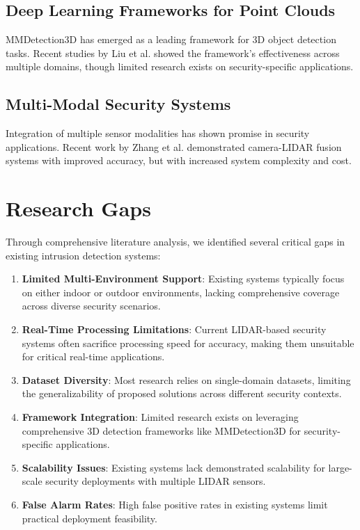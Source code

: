 \documentclass[conference]{IEEEtran}
\begin{document}
\subsection{Deep Learning Frameworks for Point Clouds}
MMDetection3D has emerged as a leading framework for 3D object detection tasks. Recent studies by Liu et al. \cite{liu2023mmdet} showed the framework's effectiveness across multiple domains, though limited research exists on security-specific applications.

\subsection{Multi-Modal Security Systems}
Integration of multiple sensor modalities has shown promise in security applications. Recent work by Zhang et al. \cite{zhang2023fusion} demonstrated camera-LIDAR fusion systems with improved accuracy, but with increased system complexity and cost.

\section{Research Gaps}

Through comprehensive literature analysis, we identified several critical gaps in existing intrusion detection systems:

\begin{enumerate}
\item \textbf{Limited Multi-Environment Support}: Existing systems typically focus on either indoor or outdoor environments, lacking comprehensive coverage across diverse security scenarios.

\item \textbf{Real-Time Processing Limitations}: Current LIDAR-based security systems often sacrifice processing speed for accuracy, making them unsuitable for critical real-time applications.

\item \textbf{Dataset Diversity}: Most research relies on single-domain datasets, limiting the generalizability of proposed solutions across different security contexts.

\item \textbf{Framework Integration}: Limited research exists on leveraging comprehensive 3D detection frameworks like MMDetection3D for security-specific applications.

\item \textbf{Scalability Issues}: Existing systems lack demonstrated scalability for large-scale security deployments with multiple LIDAR sensors.

\item \textbf{False Alarm Rates}: High false positive rates in existing systems limit practical deployment feasibility.
\end{enumerate}
\end{document}
